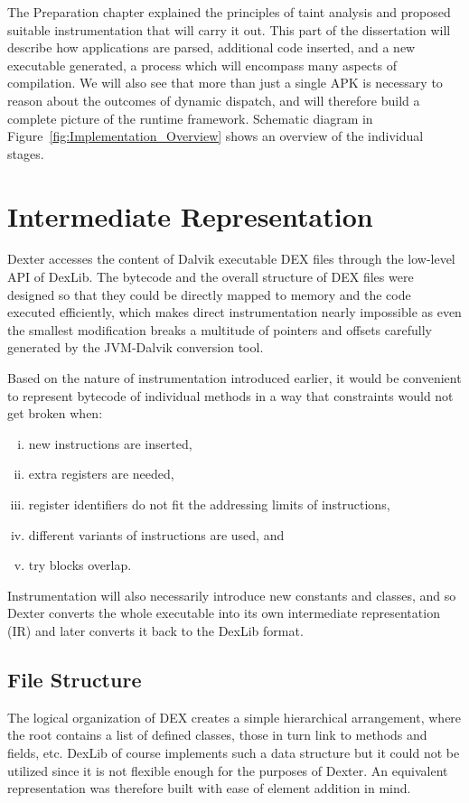 \documentclass[12pt,twoside,notitlepage]{report}
\begin{document}
The Preparation chapter explained the principles of taint analysis and proposed suitable instrumentation that will carry it out. This part of the dissertation will describe how applications are parsed, additional code inserted, and a new executable generated, a process which will encompass many aspects of compilation. We will also see that more than just a single APK is necessary to reason about the outcomes of dynamic dispatch, and will therefore build a complete picture of the runtime framework. Schematic diagram in Figure~\ref{fig:Implementation_Overview} shows an overview of the individual stages.

\section{Intermediate Representation}

Dexter accesses the content of Dalvik executable DEX files through the low-level API of DexLib. The bytecode and the overall structure of DEX files were designed so that they could be directly mapped to memory and the code executed efficiently, which makes direct instrumentation nearly impossible as even the smallest modification breaks a multitude of pointers and offsets carefully generated by the JVM-Dalvik conversion tool.

Based on the nature of instrumentation introduced earlier, it would be convenient to represent bytecode of individual methods in a way that constraints would not get broken when:
\begin{enumerate}[(i)]
\item new instructions are inserted,
\item extra registers are needed,
\item register identifiers do not fit the addressing limits of instructions,
\item different variants of instructions are used, and
\item try blocks overlap.
\end{enumerate}
Instrumentation will also necessarily introduce new constants and classes, and so Dexter converts the whole executable into its own intermediate representation (IR) and later converts it back to the DexLib format.

\subsection{File Structure}

The logical organization of DEX creates a simple hierarchical arrangement, where the root contains a list of defined classes, those in turn link to methods and fields, etc. DexLib of course implements such a data structure but it could not be utilized since it is not flexible enough for the purposes of Dexter. An equivalent representation was therefore built with ease of element addition in mind.
\end{document}
